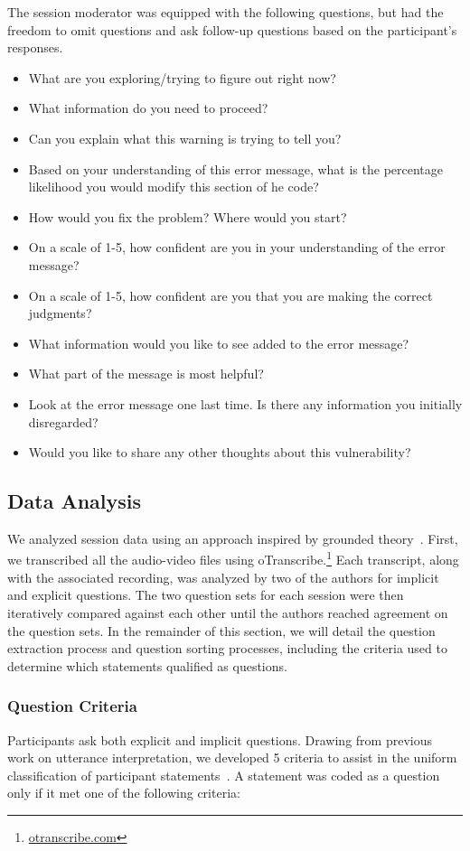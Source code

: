 \documentclass[conference]{IEEEtran}
\begin{document}
The session moderator was equipped with the following questions, but had the freedom to omit questions and ask follow-up questions based on the participant's responses.
\begin{itemize}
\item What are you exploring/trying to figure out right now?
\item What information do you need to proceed?
\item Can you explain what this warning is trying to tell you?
\item Based on your understanding of this error message, what is the percentage likelihood you would modify this section of he code?
\item How would you fix the problem? Where would you start?
\item On a scale of 1-5, how confident are you in your understanding of the error message?
\item On a scale of 1-5, how confident are you that you are making the correct judgments?
\item What information would you like to see added to the error message?
\item What part of the message is most helpful?
\item Look at the error message one last time. Is there any information you initially disregarded?
\item Would you like to share any other thoughts about this vulnerability?
\end{itemize}

\subsection{Data Analysis}
\label{dataAnalysis}
We analyzed session data using an approach inspired by grounded theory~\cite{glaser2009discovery}. 
First, we transcribed all the audio-video files using oTranscribe.\footnote{\url{otranscribe.com}}
Each transcript, along with the associated recording, was analyzed by two of the authors for implicit and explicit questions. 
The two question sets for each session were then iteratively compared against each other until the authors reached agreement on the question sets. 
In the remainder of this section, we will detail the question extraction process and question sorting processes, including the criteria used to determine which statements qualified as questions.
\subsubsection{Question Criteria}
Participants ask both explicit and implicit questions. 
Drawing from previous work on utterance interpretation, we developed 5 criteria to assist in the uniform classification of participant statements~\cite{letovsky1987cognitive}. 
A statement was coded as a question only if it met one of the following criteria:
\end{document}
